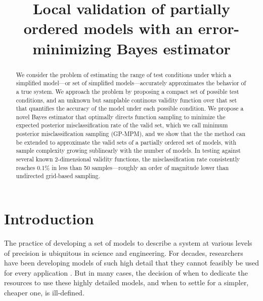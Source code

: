 \documentclass[12pt, conference]{IEEEtran}
\begin{document}
\title{Local validation of partially ordered models with an error-minimizing Bayes estimator}

\author{
}

\maketitle

\thispagestyle{plain}
\pagestyle{plain}

\begin{abstract}
We consider the problem of estimating the range of test conditions under which a simplified model---or set of simplified models---accurately approximates the behavior of a true system. We approach the problem by proposing a compact set of possible test conditions, and an unknown but samplable continous validity function over that set that quantifies the accuracy of the model under each possible condition. We propose a novel Bayes estimator that optimally directs function sampling to minimize the expected posterior misclassification rate of the valid set, which we call minimum posterior misclassification sampling (GP-MPM), and we show that the the method can be extended to approximate the valid sets of a partially ordered set of models, with sample complexity growing sublinearly with the number of models. In testing against several known 2-dimensional validity functions, the misclassification rate consistently reaches 0.1\% in less than 50 samples---roughly an order of magnitude lower than undirected grid-based sampling.
\end{abstract}


\section{Introduction}

The practice of developing a set of models to describe a system at various levels of precision is ubiquitous in science and engineering. For decades, researchers have been developing models of such high detail that they cannot feasibly be used for every application \cite{mcruer75, pearce62}. But in many cases, the decision of when to dedicate the resources to use these highly detailed models, and when to settle for a simpler, cheaper one, is ill-defined. 
\end{document}
